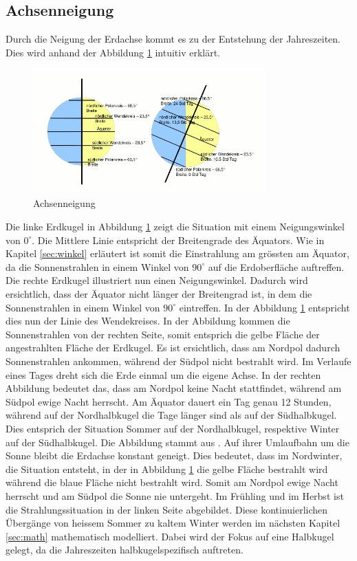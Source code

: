 \begin{refsection}
\section{Achsenneigung}\label{sec:neigung} 
Durch die Neigung der Erdachse kommt es zu der Entstehung der Jahreszeiten. Dies wird anhand der Abbildung \ref{fig:abb6} intuitiv erklärt. 
%
\begin{figure}
	\centering
	\includegraphics[width= 0.8\textwidth]{tagundnacht.png}
	\caption[Achsenneigung]{Achsenneigung}
	\label{fig:abb6}
\end{figure}
%
Die linke Erdkugel in Abbildung \ref{fig:abb6} zeigt die Situation mit einem Neigungswinkel von $0^\circ$. Die Mittlere Linie entspricht der Breitengrade des Äquators. Wie in Kapitel \ref{sec:winkel} erläutert ist somit die Einstrahlung am grössten am Äquator, da die Sonnenstrahlen in einem Winkel von $90^\circ$ auf die Erdoberfläche auftreffen. Die rechte Erdkugel illustriert nun einen Neigungswinkel. Dadurch wird ersichtlich, dass der Äquator nicht länger der Breitengrad ist, in dem die Sonnenstrahlen in einem Winkel von $90^\circ$ eintreffen. In der Abbildung \ref{fig:abb6} entspricht dies nun der Linie des Wendekreises. In der Abbildung kommen die Sonnenstrahlen von der rechten Seite, somit entsprich die gelbe Fläche der angestrahlten Fläche der Erdkugel. Es ist ersichtlich, dass am Nordpol dadurch Sonnenstrahlen ankommen, während der Südpol nicht bestrahlt wird. Im Verlaufe eines Tages dreht sich die Erde einmal um die eigene Achse. In der rechten Abbildung bedeutet das, dass am Nordpol keine Nacht stattfindet, während am Südpol ewige Nacht herrscht. Am Äquator dauert ein Tag genau 12 Stunden, während auf der Nordhalbkugel die Tage länger sind als auf der Südhalbkugel. Dies entsprich der Situation Sommer auf der Nordhalbkugel, respektive Winter auf der Südhalbkugel. Die Abbildung stammt aus \cite{fa}.
Auf ihrer Umlaufbahn um die Sonne bleibt die Erdachse konstant geneigt. Dies bedeutet, dass im Nordwinter, die Situation entsteht, in der in Abbildung \ref{fig:abb6} die gelbe Fläche bestrahlt wird während die blaue Fläche nicht bestrahlt wird. Somit am Nordpol ewige Nacht herrscht und am Südpol die Sonne nie untergeht. Im Frühling und im Herbst ist die Strahlungssituation in der linken Seite abgebildet. Diese kontinuierlichen Übergänge von heissem Sommer zu kaltem Winter werden im nächsten Kapitel \ref{sec:math} mathematisch modelliert. Dabei wird der Fokus auf eine Halbkugel gelegt, da die Jahreszeiten halbkugelspezifisch auftreten. 
\newpage


\end{refsection}
